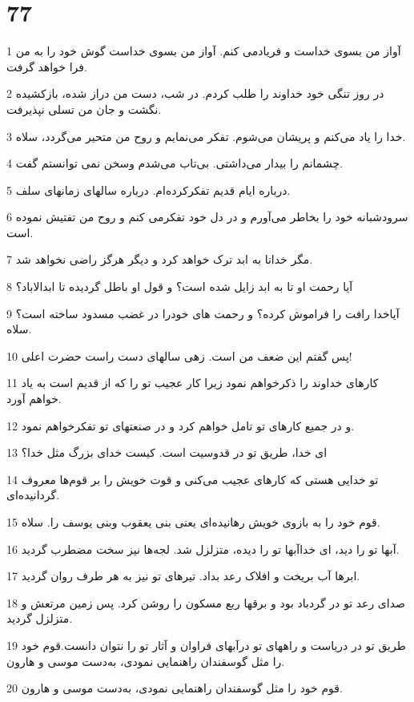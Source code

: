 \chapter{77}

\par 1 آواز من بسوی خداست و فریادمی کنم. آواز من بسوی خداست گوش خود را به من فرا خواهد گرفت.
\par 2 در روز تنگی خود خداوند را طلب کردم. در شب، دست من دراز شده، بازکشیده نگشت و جان من تسلی نپذیرفت.
\par 3 خدا را یاد می‌کنم و پریشان می‌شوم. تفکر می‌نمایم و روح من متحیر می‌گردد، سلاه.
\par 4 چشمانم را بیدار می‌داشتی. بی‌تاب می‌شدم وسخن نمی توانستم گفت.
\par 5 درباره ایام قدیم تفکرکرده‌ام. درباره سالهای زمانهای سلف.
\par 6 سرودشبانه خود را بخاطر می‌آورم و در دل خود تفکرمی کنم و روح من تفتیش نموده است.
\par 7 مگر خداتا به ابد ترک خواهد کرد و دیگر هرگز راضی نخواهد شد.
\par 8 آیا رحمت او تا به ابد زایل شده است؟ و قول او باطل گردیده تا ابدالاباد؟
\par 9 آیاخدا رافت را فراموش کرده؟ و رحمت های خودرا در غضب مسدود ساخته است؟ سلاه.
\par 10 پس گفتم این ضعف من است. زهی سالهای دست راست حضرت اعلی!
\par 11 کارهای خداوند را ذکرخواهم نمود زیرا کار عجیب تو را که از قدیم است به یاد خواهم آورد.
\par 12 و در جمیع کارهای تو تامل خواهم کرد و در صنعتهای تو تفکرخواهم نمود.
\par 13 ‌ای خدا، طریق تو در قدوسیت است. کیست خدای بزرگ مثل خدا؟
\par 14 تو خدایی هستی که کارهای عجیب می‌کنی و قوت خویش را بر قوم‌ها معروف گردانیده‌ای.
\par 15 قوم خود را به بازوی خویش رهانیده‌ای یعنی بنی یعقوب وبنی یوسف را. سلاه.
\par 16 آبها تو را دید، ای خداآبها تو را دیده، متزلزل شد. لجه‌ها نیز سخت مضطرب گردید.
\par 17 ابرها آب بریخت و افلاک رعد بداد. تیرهای تو نیز به هر طرف روان گردید.
\par 18 صدای رعد تو در گردباد بود و برقها ربع مسکون را روشن کرد. پس زمین مرتعش و متزلزل گردید.
\par 19 طریق تو در دریاست و راههای تو درآبهای فراوان و آثار تو را نتوان دانست.قوم خود را مثل گوسفندان راهنمایی نمودی، به‌دست موسی و هارون.
\par 20 قوم خود را مثل گوسفندان راهنمایی نمودی، به‌دست موسی و هارون.
 
